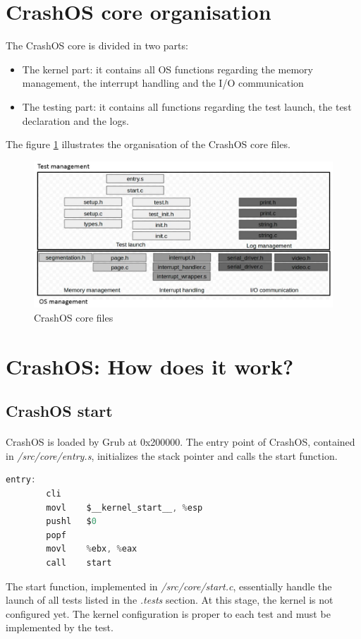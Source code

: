\documentclass[12pt, openany]{report}
\begin{document}
\section*{CrashOS core organisation}
The CrashOS core is divided in two parts:
\begin{itemize}
	\item The kernel part: it contains all OS functions regarding the memory management, the interrupt handling and the I/O communication
	\item The testing part: it contains all functions regarding the test launch, the test declaration and the logs.
\end{itemize}
The figure \ref{orga} illustrates the organisation of the CrashOS core files.
\begin{figure}[H]
	\centering
	\includegraphics[width=14cm]{images/img31.jpg}
	\caption{CrashOS core files}
	\label{orga}
\end{figure}

\section*{CrashOS: How does it work?}

\subsection*{CrashOS start}

\paragraph{} CrashOS is loaded by Grub at 0x200000. The entry point of CrashOS, contained in \emph{/src/core/entry.s}, initializes the stack pointer and calls the start function. 
\begin{lstlisting}[language=c]
entry:
        cli
        movl    $__kernel_start__, %esp
        pushl   $0
        popf
        movl    %ebx, %eax
        call    start
\end{lstlisting}
The start function, implemented in \emph{/src/core/start.c}, essentially handle the launch of all tests listed in the \emph{.tests} section. At this stage, the kernel is not configured yet. The kernel configuration is proper to each test and must be implemented by the test.
\end{document}
